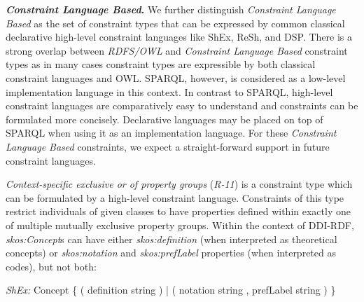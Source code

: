 \documentclass[conference]{IEEEtran}
\begin{document}
\textbf{\emph{Constraint Language Based}.}
We further distinguish \emph{Constraint Language Based} as the set of constraint types that can be expressed by common classical declarative high-level constraint languages like ShEx, ReSh, and DSP. 
There is a strong overlap between \emph{RDFS/OWL} and \emph{Constraint Language Based} constraint types as in many cases constraint types are expressible by both classical constraint languages and OWL. SPARQL, however, is considered as a low-level implementation language in this context. In contrast to SPARQL, high-level constraint languages are comparatively easy to understand and constraints can be formulated more concisely. Declarative languages may be placed on top of SPARQL when using it as an implementation language. For these \emph{Constraint Language Based} constraints, we expect a straight-forward support in future constraint languages.

\emph{Context-specific exclusive or of property groups} (\emph{R-11}) is a constraint type which can be formulated by a high-level constraint language. Constraints of this type restrict individuals of given classes to have properties defined within exactly one of multiple mutually exclusive property groups. Within the context of DDI-RDF, \emph{skos:Concept}s can have either \emph{skos:definition} (when interpreted as theo\-reti\-cal concepts) or \emph{skos:notation} and \emph{skos:prefLabel} properties (when interpreted as codes), but not both:

\begin{ex}[commandchars=\\\{\}]
\textit{ShEx:} Concept \{ 
    ( definition string ) |
    ( notation string , prefLabel string ) \}
\end{ex}

\end{document}
